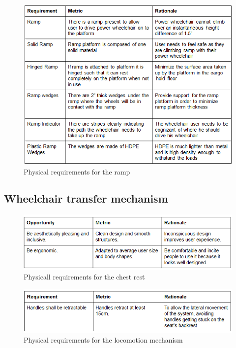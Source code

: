 \begin{figure}[h!]
  \centering
     \includegraphics[scale=1]{images/physical_requirements_ramp.png}
   \caption{Physical requirements for the ramp}
  \label{fig:phy_req_ramp}
\end{figure}

\newpage

\subsection*{Wheelchair transfer mechanism}

\begin{figure}[h!]
  \centering
     \includegraphics[scale=1]{images/physical_requirements_chest_rest.png}
   \caption{Physicall requirements for the chest rest}
  \label{fig:phy_req_chest_rest}
\end{figure}

\begin{figure}[h!]
  \centering
     \includegraphics[scale=1]{images/physical_requirements_locomotion_mechanism.png}
   \caption{Physical requirements for the locomotion mechanism}
  \label{fig:phy_req_locomotion_mechanism}
\end{figure}

